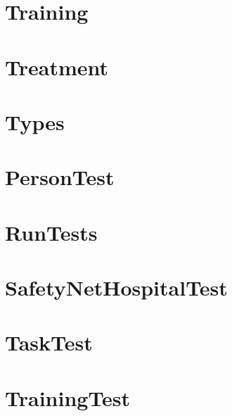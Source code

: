 \documentclass{article}
\begin{document}
\section{Training}

\section{Treatment}

\section{Types}

\section{PersonTest}

\section{RunTests}

\section{SafetyNetHospitalTest}

\section{TaskTest}

\section{TrainingTest}

\end{document}
